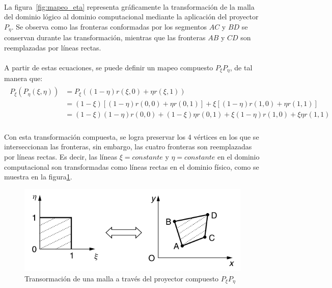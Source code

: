 \documentclass[letterpaper, openright, 12pt]{book}
\begin{document}
    \paragraph*{}
    La figura~\ref{fig:mapeo_eta} representa gráficamente la transformación
    de la malla del dominio lógico al dominio computacional mediante la
    aplicación del proyector $P_{\eta}$. Se observa como las fronteras
    conformadas por los segmentos $AC$ y $BD$ se conservan durante las
    transformación, mientras que las fronteras $AB$ y $CD$ son reemplazadas
    por líneas rectas.

    \paragraph*{}
    A partir de estas ecuaciones, se puede definir un mapeo compuesto
    $P_{\xi}P_{\eta}$, de tal manera que:
    \begin{align}
        \begin{aligned}
            P_{\xi}(P_{\eta}(\xi, \eta)) &= P_{\xi} ((1 - \eta)r(\xi, 0) + \eta r(\xi, 1)) \\
            &= (1 - \xi) \left[ (1 - \eta)r(0, 0) + \eta r(0, 1) \right] + \xi \left[ (1 - \eta)r(1, 0) + \eta r(1,1) \right]\\
            &= (1 - \xi)(1 - \eta)r(0, 0) + (1-\xi)\eta r(0, 1) + \xi(1 - \eta)r(1, 0) + \xi\eta r(1, 1)
        \end{aligned}
    \end{align}

    \paragraph*{}
    Con esta transformación compuesta, se logra preservar los 4 vértices en
    los que se interseccionan las fronteras, sin embargo, las cuatro
    fronteras son reemplazadas por líneas rectas. Es decir, las líneas
    $\xi = constante$ y $\eta = constante$ en el dominio computacional son
    transformadas como líneas rectas en el dominio físico, como se muestra
    en la figura\ref{fig:mapeo_xieta}.
    \begin{figure}[htbp!]
        \centering
        \includegraphics[keepaspectratio, width=120mm]{./img/mapeo_xieta}
        \caption[Transformación de malla por $P_{\xi}P_{\eta}$]{Transormación
        de una malla a través del proyector compuesto
        $P_{\xi}P_{\eta}$\cite{farrashkhalvat}}
        \label{fig:mapeo_xieta}
    \end{figure}
\end{document}
